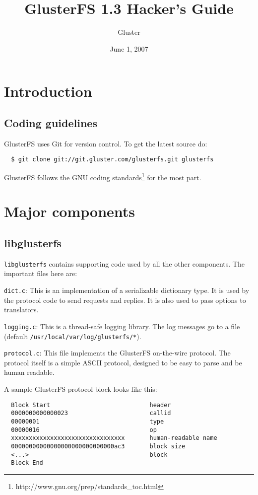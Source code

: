 \documentclass{book}[12pt]
\begin{document}

\author{Gluster}
\title{GlusterFS 1.3 Hacker's Guide}
\date{June 1, 2007}

\maketitle
\frontmatter
\tableofcontents

\mainmatter
\chapter{Introduction}

\section{Coding guidelines}
GlusterFS uses Git for version control. To get the latest source do:
\begin{verbatim}
  $ git clone git://git.gluster.com/glusterfs.git glusterfs
\end{verbatim}
\noindent
GlusterFS follows the GNU coding
standards\footnote{http://www.gnu.org/prep/standards\_toc.html} for the
most part.

\chapter{Major components}
\section{libglusterfs}
\texttt{libglusterfs} contains supporting code used by all the other components. 
The important files here are:

\texttt{dict.c}: This is an implementation of a serializable dictionary type. It is
used by the protocol code to send requests and replies. It is also used to pass options
to translators.

\texttt{logging.c}: This is a thread-safe logging library. The log messages go to a
file (default \texttt{/usr/local/var/log/glusterfs/*}).

\texttt{protocol.c}: This file implements the GlusterFS on-the-wire
protocol. The protocol itself is a simple ASCII protocol, designed to
be easy to parse and be human readable.

A sample GlusterFS protocol block looks like this:
\begin{verbatim}
  Block Start                            header
  0000000000000023                       callid
  00000001                               type
  00000016                               op
  xxxxxxxxxxxxxxxxxxxxxxxxxxxxxxxx       human-readable name
  00000000000000000000000000000ac3       block size
  <...>                                  block
  Block End
\end{verbatim}
\end{document}
